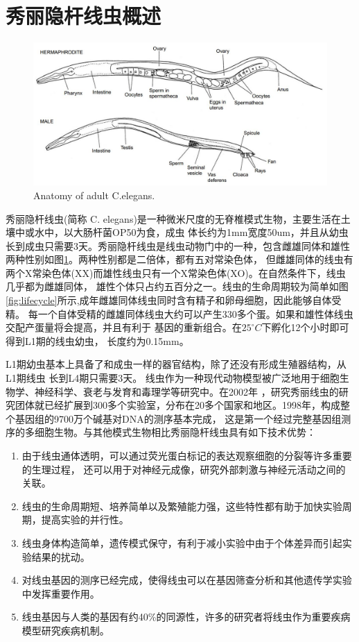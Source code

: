 \section{秀丽隐杆线虫概述}
	\begin{figure}[h]
	  \centering
	  \includegraphics[width=14cm]{figure/chap1/Celegans.jpg}
		{Anatomy of adult C.elegans.}
	  \label{fig:Celegans}
	\end{figure}
	秀丽隐杆线虫(简称 C. elegans)是一种微米尺度的无脊椎模式生物，主要生活在土壤中或水中，以大肠杆菌OP50为食，成虫
	体长约为1mm宽度50um，并且从幼虫长到成虫只需要3天。秀丽隐杆线虫是线虫动物门中的一种，包含雌雄同体和雄性两种性别如图\ref{fig:Celegans}。两种性别都是二倍体，都有五对常染色体，
	但雌雄同体的线虫有两个X常染色体(XX)而雄性线虫只有一个X常染色体(XO)。在自然条件下，线虫几乎都为雌雄同体，
	雄性个体只占约五百分之一。线虫的生命周期较为简单如图\ref{fig:lifecycle}所示,成年雌雄同体线虫同时含有精子和卵母细胞，因此能够自体受精。
	每一个自体受精的雌雄同体线虫大约可以产生330多个蛋。如果和雄性体线虫交配产蛋量将会提高，并且有利于
	基因的重新组合。在$25^\circ C$下孵化12个小时即可得到L1期的线虫幼虫，
	长度约为0.15mm。
	
	L1期幼虫基本上具备了和成虫一样的器官结构，除了还没有形成生殖器结构，从L1期线虫
	长到L4期只需要3天。
	线虫作为一种现代动物模型被广泛地用于细胞生物学、神经科学、衰老与发育和毒理学等研究中。在2002年
	，研究秀丽线虫的研究团体就已经扩展到300多个实验室，分布在20多个国家和地区。1998年，构成整个基因组的9700万个碱基对DNA的测序基本完成，
	这是第一个经过完整基因组测序的多细胞生物。与其他模式生物相比秀丽隐杆线虫具有如下技术优势：
	
	\begin{enumerate}[label={\alph*)},font={\color{black!50!black}\bfseries}]
	  \item 由于线虫通体透明，可以通过荧光蛋白标记的表达观察细胞的分裂等许多重要的生理过程，
	  还可以用于对神经元成像，研究外部刺激与神经元活动之间的关联。
	  \item 线虫的生命周期短、培养简单以及繁殖能力强，这些特性都有助于加快实验周期，提高实验的并行性。
	  \item 线虫身体构造简单，遗传模式保守，有利于减小实验中由于个体差异而引起实验结果的扰动。
	  \item 对线虫基因的测序已经完成，使得线虫可以在基因筛查分析和其他遗传学实验中发挥重要作用。
	  \item 线虫基因与人类的基因有约40\%的同源性，许多的研究者将线虫作为重要疾病模型研究疾病机制。
	\end{enumerate}
	

